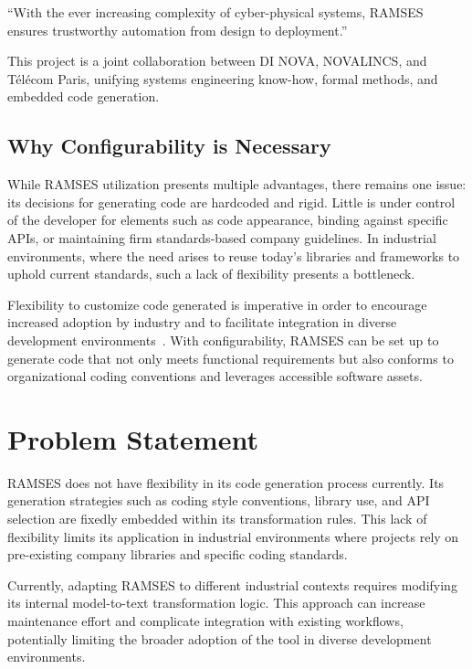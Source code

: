 \begin{tcolorbox}[colback=green!8]
	“With the ever increasing complexity of cyber-physical systems, RAMSES ensures trustworthy automation from design to deployment.”
\end{tcolorbox}

This project is a joint collaboration between DI NOVA, NOVALINCS, and Télécom Paris, unifying systems engineering know-how, formal methods, and embedded code generation.


\subsection{Why Configurability is Necessary}

While RAMSES utilization presents multiple advantages, there remains one issue: its decisions for generating code are hardcoded and rigid. Little is under control of the developer for elements such as code appearance, binding against specific APIs, or maintaining firm standards-based company guidelines. In industrial environments, where the need arises to reuse today's libraries and frameworks to uphold current standards, such a lack of flexibility presents a bottleneck. 
\par
Flexibility to customize code generated is imperative in order to encourage increased adoption by industry and to facilitate integration in diverse development environments~\cite{Mikova_2025}. With configurability, RAMSES can be set up to generate code that not only meets functional requirements but also conforms to organizational coding conventions and leverages accessible software assets.

\section{Problem Statement}

RAMSES does not have flexibility in its code generation process currently. Its generation strategies such as coding style conventions, library use, and API selection are fixedly embedded within its transformation rules. This lack of flexibility limits its application in industrial environments where projects rely on pre-existing company libraries and specific coding standards.
\par
Currently, adapting RAMSES to different industrial contexts requires modifying its internal model-to-text transformation logic. This approach can increase maintenance effort and complicate integration with existing workflows, potentially limiting the broader adoption of the tool in diverse development environments. 


